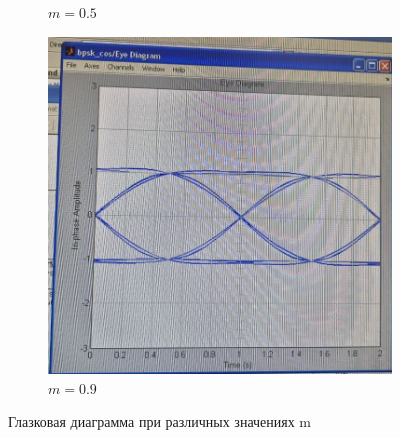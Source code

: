 \documentclass[14pt, a4paper]{article}
\begin{document}
\begin{figure}[H]
\begin{subfigure}{.33\textwidth}
  \caption{$m=0.5$}
\end{subfigure}
\begin{subfigure}{.33\textwidth}
  \centering
  \includegraphics[width=.95\linewidth]{../images/rt2-7f}
  \caption{$m=0.9$}
\end{subfigure}%
\caption{Глазковая диаграмма при различных значениях m}
\end{figure}
\end{document}
